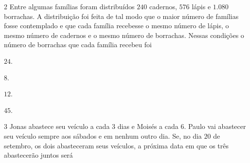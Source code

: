 
\num{2}  Entre algumas famílias foram distribuídos $240$ cadernos, $576$ lápis e
$1.080$ borrachas. A distribuição foi feita de tal modo que o maior número
de famílias fosse contemplado e que cada família recebesse o mesmo
número de lápis, o mesmo número de cadernos e o mesmo número de
borrachas. Nessas condições o número de borrachas que cada família
recebeu foi

\begin{escolha}
\item $24$.
\item $8$.
\item $12$. 
\item $45$.
\end{escolha}



\num{3}  Jonas abastece seu veículo a cada $3$ dias e Moisés a cada $6$. Paulo vai
abastecer seu veículo sempre aos sábados e em nenhum outro dia. Se, no
dia $20$ de setembro, os dois abasteceram seus veículos, a próxima data em
que os três abastecerão juntos será

